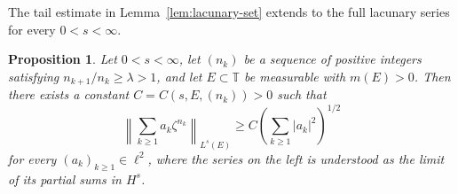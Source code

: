 \documentclass[10pt,a4paper]{amsart}
\newtheorem{proposition}[theorem]{Proposition}
\newcommand{\T}{\mathbb{T}}
\begin{document}
The tail estimate in Lemma~\ref{lem:lacunary-set} extends to
the full lacunary series for every \(0<s<\infty\).

\begin{proposition}
\label{prop:lacunary-local}
Let \(0<s<\infty\), let \((n_k)\) be a sequence of positive integers
satisfying \(n_{k+1}/n_k\ge\lambda>1\), and let \(E\subset\T\) be
measurable with \(m(E)>0\). Then there exists a constant
\(C=C(s,E,(n_k))>0\) such that
\begin{equation}
\label{eq:local-full}
        \left\|
        \sum_{k\ge1}a_k\zeta^{n_k}
        \right\|_{L^s(E)}
        \ge
        C\left(\sum_{k\ge1}|a_k|^2\right)^{1/2}
\end{equation}
for every \((a_k)_{k\ge1}\in\ell^2\), where the series on the left is
understood as the limit of its partial sums in \(H^s\).
\end{proposition}
\end{document}
